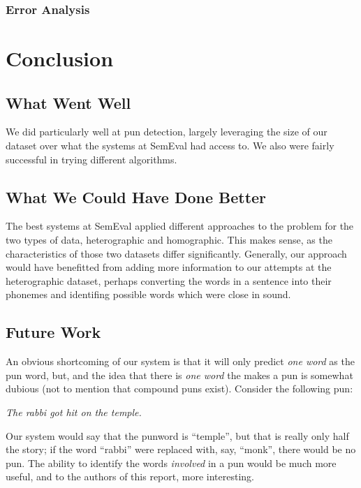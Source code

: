 \documentclass{article}
\begin{document}
\subsubsection{Error Analysis}

\section{Conclusion}\label{conclusion}

\subsection{What Went Well}

We did particularly well at pun detection, largely leveraging the size of our
dataset over what the systems at SemEval had access to. We also were fairly
successful in trying different algorithms. 

\subsection{What We Could Have Done Better}

The best systems at SemEval applied different approaches to the problem for the
two types of data, heterographic and homographic. This makes sense, as the
characteristics of those two datasets differ significantly. Generally, our
approach would have benefitted from adding more information to our attempts at
the heterographic dataset, perhaps converting the words in a sentence into their
phonemes and identifing possible words which were close in sound.

\subsection{Future Work}

An obvious shortcoming of our system is that it will only predict \emph{one
word} as the pun word, but, and the idea that there is \emph{one word} the makes
a pun is somewhat dubious (not to mention that compound puns exist). Consider
the following pun: 
\begin{center}
	\emph{The rabbi got hit on the temple.}
\end{center}
Our system would say that the punword is ``temple'', but that is really only half
the story; if the word ``rabbi'' were replaced with, say, ``monk'', there would
be no pun. The ability to identify the words \emph{involved} in a pun would be
much more useful, and to the authors of this report, more interesting.
\end{document}
